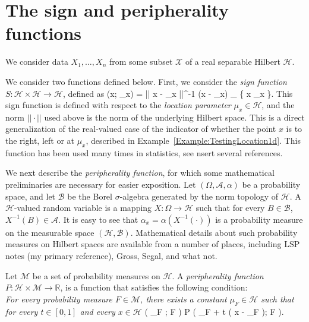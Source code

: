 \documentclass[12pt,letterpaper]{article}
\newcommand{\BR}{\mathbb{R}}
\newcommand{\cA}{\mathcal{A}}
\newcommand{\cB}{\mathcal{B}}
\newcommand{\cH}{\mathcal{H}}
\newcommand{\cI}{\mathcal{I}}
\newcommand{\cM}{\mathcal{M}}
\newcommand{\cX}{\mathcal{X}}
\def\ban#1\ean{\begin{align*}#1\end{align*}}
\def\bredbf#1\eredbf{{\color{red}{\bf ???? #1 ????}}}
\theoremstyle{Example}
\begin{document}
\section{The sign and peripherality functions}
\label{Section:SP}
 
We consider data $X_{1}, \ldots, X_{n}$ from some subset $\cX$ of 
a real separable Hilbert $\cH$. 

We consider two functions defined below. First, we consider the 
{\it sign function} $S : \cH \times \cH \rightarrow \cH$, defined as 
\ban
S (x; \mu_{x}) = || x - \mu_{x} ||^{-1} (x - \mu_{x}) {\cI}_{ \{ x \ne \mu_{x} \}}. 
\ean
This sign function is defined with respect to the {\it location parameter} 
$\mu_{x} \in \cH$, and the norm $|| \cdot ||$ used above is the norm of the 
underlying Hilbert space. This is a direct  generalization of the 
real-valued case of the indicator of whether the point $x$ is to the right, 
left or at $\mu_{x}$, described in Example~\ref{Example:TestingLocation1d}. 
This function has been used many times in statistics, see
\bredbf insert several references. \eredbf

We next describe the {\it peripherality function}, for which some mathematical 
preliminaries are necessary for easier exposition. Let $(\Omega, \cA, \alpha)$ 
be a probability space, and let $\cB$ be the Borel $\sigma$-algebra generated 
by the norm topology of $\cH$. A $\cH$-valued random variable is a mapping 
$X :  \Omega \rightarrow \cH$ such that for every $B \in \cB$, $X^{-1} (B) \in \cA$. 
It is easy to see that $\alpha_{x} = \alpha ( X^{-1} (\cdot ) )$ is a probability 
measure on the measurable space $(\cH, \cB)$. Mathematical details about 
such probability measures on Hilbert spaces are available from a number of 
places, including
\bredbf
BLSP notes (my primary reference), Gross, Segal, and what not.
\eredbf


Let $\cM$ be a set of probability measures on $\cH$. 
A {\it peripherality function} 
$ P : \cH \times \cM \rightarrow \BR$,  is a function that satisfies the following 
condition:\\
{\it For every probability measure $F \in \cM$, there exists a constant $\mu_{F} \in \cH$ 
such that for every $t \in [ 0, 1]$ and every $x \in \cH$}
\ban 
P \Bigl( \mu_{F} ; F \Bigr) \leq P \Bigl( \mu_{F} + t ( x - \mu_{F} ); F \Bigr). 
\ean 
\end{document}
